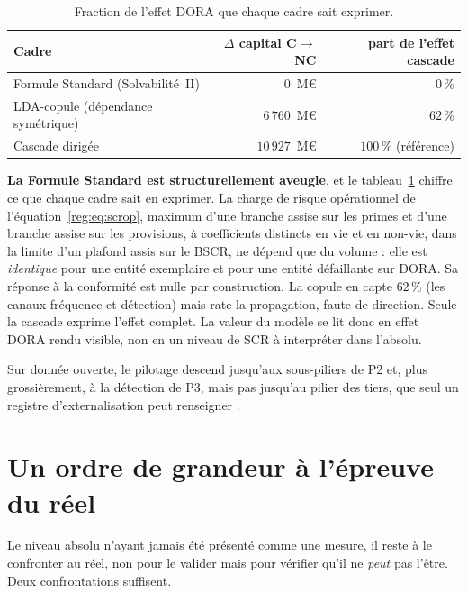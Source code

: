 \begin{table}[H]\centering\small
\renewcommand{\arraystretch}{1.25}
\begin{tabular}{@{}l r r@{}}
\toprule
\textbf{Cadre} & \textbf{$\Delta$ capital C$\to$NC} & \textbf{part de l'effet cascade} \\
\midrule
Formule Standard (Solvabilité~II) & $0$~M\euro{} & $0\,\%$ \\
LDA-copule (dépendance symétrique) & $6\,760$~M\euro{} & $62\,\%$ \\
Cascade dirigée & $10\,927$~M\euro{} & $100\,\%$ (référence) \\
\bottomrule
\end{tabular}
\caption{Fraction de l'effet DORA que chaque cadre sait exprimer.}
\label{tab:benchmark-sf}
\end{table}

\textbf{La Formule Standard est structurellement aveugle}, et le tableau~\ref{tab:benchmark-sf}
chiffre ce que chaque cadre sait en exprimer. La charge de risque opérationnel
de l'équation~\eqref{reg:eq:scrop}, maximum d'une branche assise sur les primes et d'une branche
assise sur les provisions, à coefficients distincts en vie et en non-vie, dans la limite d'un
plafond assis sur le BSCR, ne dépend que du volume : elle est \emph{identique} pour une entité
exemplaire et pour une entité défaillante sur DORA. Sa réponse à la conformité est nulle par
construction. La copule en capte $62\,\%$ (les canaux fréquence et détection) mais rate la
propagation, faute de direction. Seule la cascade exprime l'effet complet. La valeur du
modèle se lit donc en effet DORA rendu visible, non en un niveau de SCR à
interpréter dans l'absolu.

Sur donnée ouverte, le pilotage descend jusqu'aux sous-piliers de P2 et, plus grossièrement, à
la détection de P3, mais pas jusqu'au pilier des tiers, que seul un registre d'externalisation
peut renseigner \matcomp.

\section{Un ordre de grandeur à l'épreuve du réel}
\label{sec:ancrage}

Le niveau absolu n'ayant jamais été présenté comme une mesure, il reste à le confronter au
réel, non pour le valider mais pour vérifier qu'il ne \emph{peut} pas l'être. Deux
confrontations suffisent.

